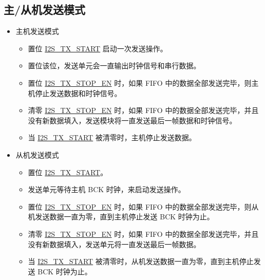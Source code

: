 \documentclass[main\_\_CN.tex]{subfiles}
\begin{document}
\subsection{主/从机发送模式} \label{sec:i2s-master-slave-tx-mode}
\begin{itemize}
    \item 主机发送模式
    \begin{itemize}
        \item 置位 \hyperref[fielddesc:I2STXSTART]{I2S\_TX\_START} 启动一次发送操作。
        \item 置位该位，发送单元会一直输出时钟信号和串行数据。
        \item 置位 \hyperref[fielddesc:I2STXSTOPEN]{I2S\_TX\_STOP\_EN} 时，如果 FIFO 中的数据全部发送完毕，则主机停止发送数据和时钟信号。
        \item 清零 \hyperref[fielddesc:I2STXSTOPEN]{I2S\_TX\_STOP\_EN} 时，如果 FIFO 中的数据全部发送完毕，并且没有新数据填入，发送模块将一直发送最后一帧数据和时钟信号。
        \item 当 \hyperref[fielddesc:I2STXSTART]{I2S\_TX\_START} 被清零时，主机停止发送数据。
    \end{itemize}
    \item 从机发送模式
     \begin{itemize}
        \item 置位 \hyperref[fielddesc:I2STXSTART]{I2S\_TX\_START}。
        \item 发送单元等待主机 BCK 时钟，来启动发送操作。
        \item 置位 \hyperref[fielddesc:I2STXSTOPEN]{I2S\_TX\_STOP\_EN} 时，如果 FIFO 中的数据全部发送完毕，则从机发送数据一直为零，直到主机停止发送 BCK 时钟为止。
        \item 清零 \hyperref[fielddesc:I2STXSTOPEN]{I2S\_TX\_STOP\_EN} 时，如果 FIFO 中的数据全部发送完毕，并且没有新数据填入，发送单元将一直发送最后一帧数据。
        \item 当 \hyperref[fielddesc:I2STXSTART]{I2S\_TX\_START} 被清零时，从机发送数据一直为零，直到主机停止发送 BCK 时钟为止。
    \end{itemize}
\end{itemize}
\end{document}
